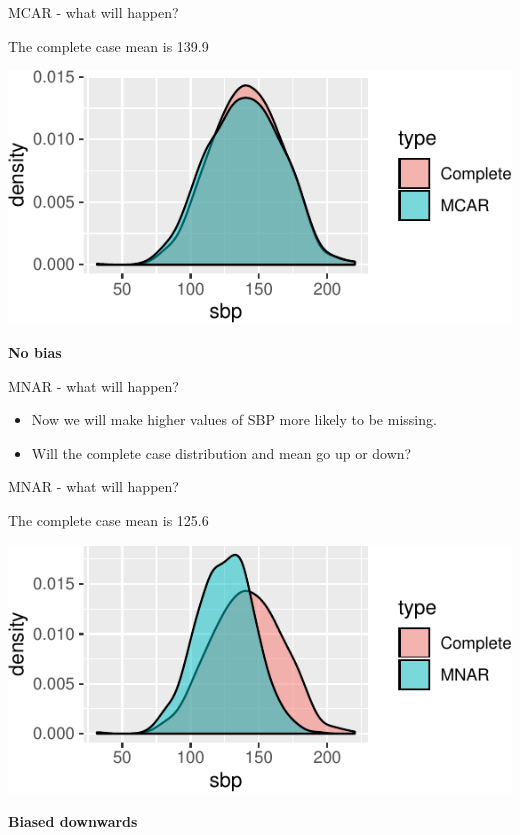 \documentclass[ignorenonframetext,]{beamer}
\providecommand{\tightlist}{%
  \setlength{\itemsep}{0pt}\setlength{\parskip}{0pt}}
\begin{document}
\begin{frame}{MCAR - what will happen?}
\protect\hypertarget{mcar---what-will-happen-1}{}

The complete case mean is 139.9

\begin{center}\includegraphics{Lecture2_files/figure-beamer/unnamed-chunk-4-1} \end{center}

\textbf{No bias}

\end{frame}

\begin{frame}{MNAR - what will happen?}
\protect\hypertarget{mnar---what-will-happen}{}

\begin{itemize}
\tightlist
\item
  Now we will make higher values of SBP more likely to be missing.
\item
  Will the complete case distribution and mean go up or down?
\end{itemize}

\end{frame}

\begin{frame}{MNAR - what will happen?}
\protect\hypertarget{mnar---what-will-happen-1}{}

The complete case mean is 125.6

\begin{center}\includegraphics{Lecture2_files/figure-beamer/unnamed-chunk-6-1} \end{center}

\textbf{Biased downwards}

\end{frame}
\end{document}
